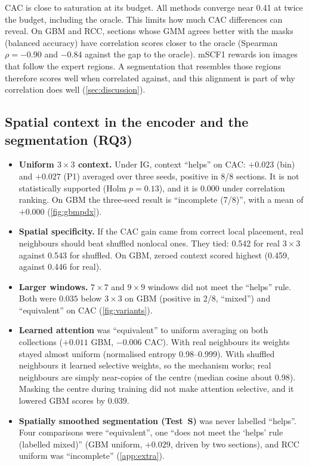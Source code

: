 CAC is close to saturation at its budget. All methods converge near 0.41 at
twice the budget, including the oracle. This limits how much CAC differences
can reveal. On GBM and RCC, sections whose GMM agrees better with the masks
(balanced accuracy) have correlation scores closer to the oracle (Spearman
$\rho=-0.90$ and $-0.84$ against the gap to the oracle). mSCF1 rewards ion
images that follow the expert regions. A segmentation that resembles those
regions therefore scores well when correlated against, and this alignment is
part of why correlation does well (\cref{sec:discussion}).

\subsection{Spatial context in the encoder and the segmentation (RQ3)}
\label{sec:res-spatial}
\begin{itemize}
  \item \textbf{Uniform $3\times3$ context.} Under IG, context ``helps'' on
        CAC: $+0.023$ (bin) and $+0.027$ (P1) averaged over three seeds, positive
        in 8/8 sections. It is not statistically supported (Holm $p=0.13$), and
        it is 0.000 under correlation ranking. On GBM the three-seed result is
        ``incomplete (7/8)'', with a mean of $+0.000$ (\cref{fig:gbmpdx}).
  \item \textbf{Spatial specificity.} If the CAC gain came from correct local
        placement, real neighbours should beat shuffled nonlocal ones. They
        tied: 0.542 for real $3\times3$ against 0.543 for shuffled. On GBM,
        zeroed context scored highest (0.459, against 0.446 for real).
  \item \textbf{Larger windows.} $7\times7$ and $9\times9$ windows did not meet
        the ``helps'' rule. Both were $0.035$ below $3\times3$ on GBM (positive
        in 2/8, ``mixed'') and ``equivalent'' on CAC (\cref{fig:variants}).
  \item \textbf{Learned attention} was ``equivalent'' to uniform averaging on
        both collections ($+0.011$ GBM, $-0.006$ CAC). With real neighbours its
        weights stayed almost uniform (normalised entropy 0.98--0.999). With
        shuffled neighbours it learned selective weights, so the mechanism
        works; real neighbours are simply near-copies of the centre (median
        cosine about 0.98). Masking the centre during training did not make
        attention selective, and it lowered GBM scores by $0.039$.
  \item \textbf{Spatially smoothed segmentation (Test~S)} was never labelled
        ``helps''. Four comparisons were ``equivalent'', one ``does not meet
        the `helps' rule (labelled mixed)'' (GBM uniform, $+0.029$, driven by
        two sections), and RCC uniform was ``incomplete'' (\cref{app:extra}).
\end{itemize}

